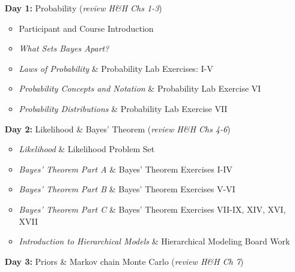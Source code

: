 \documentclass[11pt]{article}
\begin{document}
\begin{enumerate}
\item[\textbf{Day 1:}] Probability (\emph{review H\&H Chs 1-3})

\begin{itemize}
\item Participant and Course Introduction %
\item \emph{What Sets Bayes Apart?} %
\item \emph{Laws of Probability} \& Probability Lab Exercises: I-V %
\item \emph{Probability Concepts and Notation} \& Probability Lab Exercise VI %
\item \emph{Probability Distributions}  \& Probability Lab Exercise VII %
\end{itemize}

\item[\textbf{Day 2:}] Likelihood \& Bayes' Theorem (\emph{review H\&H Chs 4-6})

\begin{itemize}
\item \emph{Likelihood} \& Likelihood Problem Set %
\item \emph{Bayes' Theorem Part A} \& Bayes' Theorem Exercises I-IV %
\item \emph{Bayes' Theorem Part B} \& Bayes' Theorem Exercises  V-VI %
\item \emph{Bayes' Theorem Part C} \& Bayes' Theorem Exercises VII-IX, XIV, XVI, XVII %
\item \emph{Introduction to Hierarchical Models} \& Hierarchical Modeling Board Work %
\end{itemize}


\item[\textbf{Day 3:}] Priors \& Markov chain Monte Carlo (\emph{review H\&H Ch 7})


\end{enumerate}
\end{document}
